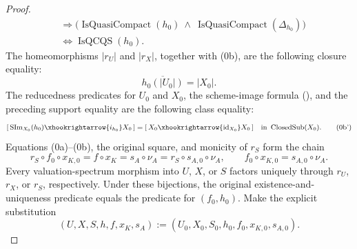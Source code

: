 \begin{proof}
\[\begin{aligned}
      &\Longrightarrow
        \bigl(
          \operatorname{IsQuasiCompact}(h_0)\ \wedge\
          \operatorname{IsQuasiCompact}(\Delta_{h_0})
        \bigr)\\
      &\Longleftrightarrow \operatorname{IsQCQS}(h_0).
  \end{aligned}                                                    \tag{0bqcqs}
  \]
  The homeomorphisms $|r_U|$ and $|r_X|$, together with (0b), are the
  following closure equality:
  \[
    \overline{h_0(|U_0|)}=|X_0|.
  \]
  The reducedness predicates for $U_0$ and $X_0$, the scheme-image formula
  (\cite[\href{https://stacks.math.columbia.edu/tag/056B}{Tag 056B}]
  {stacks-project}), and the preceding support equality are the following
  class equality:
  \[
    [\,\operatorname{SIm}_{X_0}(h_0)\xhookrightarrow{i_{h_0}}X_0\,]
      =[\,X_0\xhookrightarrow{\operatorname{id}_{X_0}}X_0\,]
      \quad\text{in }\operatorname{ClosedSub}(X_0).              \tag{0b'}
  \]
  Equations (0a)--(0b), the original square, and monicity of $r_S$ form the
  chain
  \[
    r_S\circ f_0\circ x_{K,0}
      =f\circ x_K
      =s_A\circ\nu_A
      =r_S\circ s_{A,0}\circ\nu_A,
    \qquad
    f_0\circ x_{K,0}=s_{A,0}\circ\nu_A.                          \tag{0c}
  \]
  Every valuation-spectrum morphism into $U$, $X$, or $S$ factors uniquely
  through $r_U$, $r_X$, or $r_S$, respectively.  Under these bijections, the
  original existence-and-uniqueness predicate equals the predicate for
  $(f_0,h_0)$.  Make the explicit substitution
  \[
    (U,X,S,h,f,x_K,s_A)
      :=(U_0,X_0,S_0,h_0,f_0,x_{K,0},s_{A,0}).
  \]


\end{proof}
